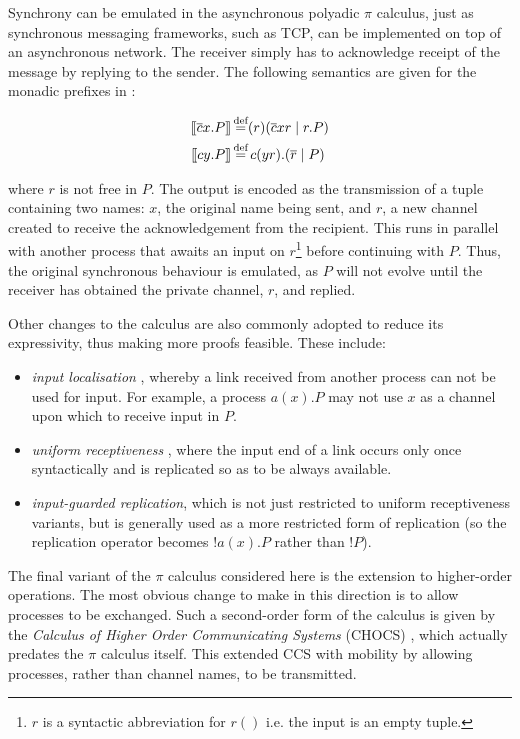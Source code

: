   Synchrony can be emulated in the asynchronous polyadic $\pi$
  calculus, just as synchronous messaging frameworks, such as TCP, can
  be implemented on top of an asynchronous network.  The receiver
  simply has to acknowledge receipt of the message by replying to the
  sender.  The following semantics are given for the monadic prefixes
  in \cite{boxedamb01}:

\begin{align}
\seml \overline{c}x.P \semr & \eqdef (r)(\overline{c}xr\;|\;r.P) \\
\seml cy.P \semr & \eqdef c(yr).(\overline{r}\;|\;P)
\end{align}

\noindent where $r$ is not free in $P$.  The output is encoded as the
transmission of a tuple containing two names: $x$, the original name
being sent, and $r$, a new channel created to receive the
acknowledgement from the recipient.  This runs in parallel with
another process that awaits an input on $r$\footnote{$r$ is a
  syntactic abbreviation for $r()$ i.e. the input is an empty tuple.}
before continuing with $P$.  Thus, the original synchronous behaviour
is emulated, as $P$ will not evolve until the receiver has obtained
the private channel, $r$, and replied.

Other changes to the calculus are also commonly adopted to reduce its
expressivity, thus making more proofs feasible.  These include:

\begin{itemize}
\item \emph{input localisation} \cite{merro:locality}, whereby a link
  received from another process can not be used for input.  For
  example, a process $a(x).P$ may not use $x$ as a channel upon which
  to receive input in $P$.
\item \emph{uniform receptiveness}
  \cite{sangiorgi:uniformreceptiveness}, where the input end of a link
  occurs only once syntactically and is replicated so as to be always
  available.
\item \emph{input-guarded replication}, which is not just restricted
  to uniform receptiveness variants, but is generally used as a more
  restricted form of replication (so the replication operator becomes
  $!a(x).P$ rather than $!P$).
\end{itemize}

The final variant of the $\pi$ calculus considered here is the
extension to higher-order operations.  The most obvious change to make
in this direction is to allow processes to be exchanged.  Such a
second-order form of the calculus is given by the \emph{Calculus of
  Higher Order Communicating Systems} (CHOCS) \cite{thomsen:chocs},
which actually predates the $\pi$ calculus itself.  This extended CCS
with mobility by allowing processes, rather than channel names, to be
transmitted.

